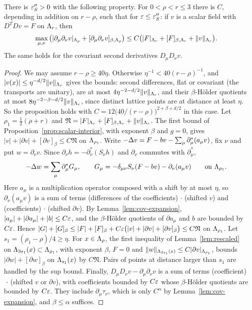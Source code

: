 \begin{proposition}\label{prop:schauder}
There is $\varepsilon_S''>0$ with the following property. For $0<\rho<r\le3$ there is $C$, depending in addition on $r-\rho$, such that for $\varepsilon\le\varepsilon_S''$: if $v$ is a scalar field with $D^TDv=F$ on $\Lambda_r$, then
\[
\max_{\mu,\nu}\big(|\partial_\mu\partial_\nu v|_{\Lambda_\rho}+[\partial_\mu\partial_\nu v]_{\beta,\Lambda_\rho}\big)\le C\big(|F|_{\Lambda_r}+[F]_{\beta,\Lambda_r}+\|v\|_{\Lambda_r}\big).
\]
The same holds for the covariant second derivatives $D_\mu D_\nu v$.
\end{proposition}

\begin{proof}
We may assume $r-\rho\ge40\eta$. Otherwise $\eta^{-1}<40(r-\rho)^{-1}$, and $|v(x)|\le\eta^{-d/2}\|v\|_{\Lambda_r}$ gives the bounds: second differences, flat or covariant (the transports are unitary), are at most $4\eta^{-2-d/2}\|v\|_{\Lambda_r}$, and their $\beta$-H\"older quotients at most $8\eta^{-2-\beta-d/2}\|v\|_{\Lambda_r}$, since distinct lattice points are at distance at least $\eta$. So the proposition holds with $C=12\big(40/(r-\rho)\big)^{2+\beta+d/2}$ in this case. Let $\rho_1=\frac12(\rho+r)$ and $\mathfrak N=|F|_{\Lambda_r}+[F]_{\beta,\Lambda_r}+\|v\|_{\Lambda_r}$. The first bound of Proposition~\ref{prop:scalar-interior}, with exponent $\beta$ and $g=0$, gives $|v|+|\partial v|+[\partial v]_\beta\le C\mathfrak N$ on $\Lambda_{\rho_1}$. Write $-\Delta v=F-bv-\sum_\mu\partial^*_\mu(a_\mu v)$, fix $\nu$ and put $w=\partial_\nu v$. Since $\partial_\nu h=-\partial^*_\nu(S_\nu h)$ and $\partial_\nu$ commutes with $\partial^*_\mu$,
\[
-\Delta w=\sum_\mu\partial^*_\mu G_\mu,\qquad G_\mu=-\delta_{\mu\nu}S_\nu(F-bv)-\partial_\nu(a_\mu v)\qquad\text{on }\Lambda_{\rho_1}.
\]
Here $a_\mu$ is a multiplication operator composed with a shift by at most $\eta$, so $\partial_\nu(a_\mu v)$ is a sum of terms (differences of the coefficients)$\,\cdot\,$(shifted $v$) and (coefficients)$\,\cdot\,$(shifted $\partial v$). By Lemma~\ref{lem:cov-expansion}, $|a_\mu|+|\partial a_\mu|+|b|\le C\varepsilon$, and the $\beta$-H\"older quotients of $\partial a_\mu$ and $b$ are bounded by $C\varepsilon$. Hence $|G|+[G]_\beta\le|F|+[F]_\beta+C\varepsilon\big(|v|+|\partial v|+[\partial v]_\beta\big)\le C\mathfrak N$ on $\Lambda_{\rho_1}$. Let $s_1=(\rho_1-\rho)/4\ge\eta$. For $x\in\Lambda_\rho$, the first inequality of Lemma~\ref{lem:rescaled} on $\Lambda_{3s_1}(x)\subset\Lambda_{\rho_1}$, with exponent $\beta$, $F=0$ and $\|w\|_{\Lambda_{2s_1}(x)}\le C|\partial v|_{\Lambda_{\rho_1}}$, bounds $|\partial w|+[\partial w]_\beta$ on $\Lambda_{s_1}(x)$ by $C\mathfrak N$. Pairs of points at distance larger than $s_1$ are handled by the sup bound. Finally, $D_\mu D_\nu v-\partial_\mu\partial_\nu v$ is a sum of terms (coefficient)$\,\cdot\,$(shifted $v$ or $\partial v$), with coefficients bounded by $C\varepsilon$ whose $\beta$-H\"older quotients are bounded by $C\varepsilon$. They include $\partial_\mu\tau_\nu$, which is only $C^\alpha$ by Lemma~\ref{lem:cov-expansion}, and $\beta\le\alpha$ suffices.
\end{proof}

